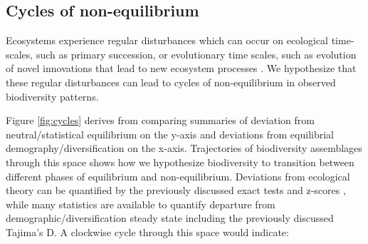 \documentclass[12pt]{article}
\begin{document}
\subsection{Cycles of non-equilibrium}

Ecosystems experience regular disturbances which can
occur on ecological time-scales, such as primary succession, or
evolutionary time scales, such as evolution of novel innovations that
lead to new ecosystem processes \citep{redQueen, erwin2008}. We
hypothesize that these regular disturbances can lead to cycles of
non-equilibrium in observed biodiversity patterns.

Figure \ref{fig:cycles} derives from comparing summaries of deviation
from neutral/statistical equilibrium on the y-axis and deviations from
equilibrial demography/diversification on the x-axis. Trajectories of
biodiversity assemblages through this space shows how we hypothesize
biodiversity to transition between different phases of equilibrium and
non-equilibrium. Deviations from ecological theory can be quantified
by the previously discussed exact tests \citep{etienne2007} and
z-scores \citep{meteR}, while many statistics are available to
quantify departure from demographic/diversification steady state
including the previously discussed Tajima's D. A clockwise cycle through this
space would indicate:
% 
% 
% 
% 
\end{document}
